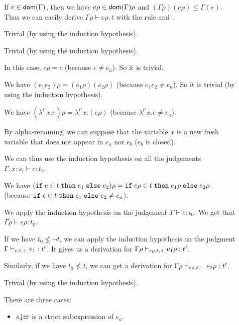 \documentclass[a4paper]{article}
\theoremstyle{definition}
\begin{document}
        \begin{description}
          \item[] If $e\in\dom\Gamma$, then we have $e\rho\in\dom\Gamma\rho$ and $(\Gamma\rho)(e\rho)\leq\Gamma(e)$.
          Thus we can easily derive $\Gamma\rho\vdash e\rho:t$ with the rule  and .
          \item[] Trivial (by using the induction hypothesis).
          \item[] Trivial (by using the induction hypothesis).
          \item[] In this case, $c\rho = c$ (because $c \neq e_a$). So it is trivial.
          \item[] We have $(e_1 e_2)\rho = (e_1\rho) (e_2\rho)$ (because $e_1 e_2 \neq e_a$).
          So it is trivial (by using the induction hypothesis).
          \item[] We have $(\lambda^{t'}x.e)\rho = \lambda^{t'}x.(e\rho)$ (because $\lambda^{t'}x.e \neq e_a$).
          
          By alpha-renaming, we can suppose that the variable $x$ is a new fresh variable that does not appear
          in $e_a$ nor $e_b$ ($e_b$ is closed).
          
          We can thus use the induction hypothesis on all the judgements $\Gamma, x:s_i \vdash e:t_i$.
          \item[]
          We have $(\ite e t {e_1} {e_2})\rho = \ite {e\rho} t {e_1\rho} {e_2\rho}$ (because $\ite e t {e_1} {e_2} \neq e_a$).

          We apply the induction hypothesis on the judgement $\Gamma\vdash e:t_0$.
          We get that $\Gamma\rho\vdash e\rho:t_0$.

          If we have $t_0\not\leq\neg t$, we can apply the induction hypothesis on the judgment $\Gamma\cvdash + e t e_1:t'$.
          It gives us a derivation for $\Gamma\rho\cvdash + {e\rho} t e_1\rho:t'$.

          Similarly, if we have $t_0\not\leq t$, we can get a derivation for $\Gamma\rho\cvdash - {e\rho} t e_2\rho:t'$.
          \item[] Trivial (by using the induction hypothesis).
          \item[] There are three cases:
          \begin{itemize}
            \item $\occ e \varpi$ is a strict subexpression of $e_a$.
            

\end{itemize}
\end{description}
\end{document}
